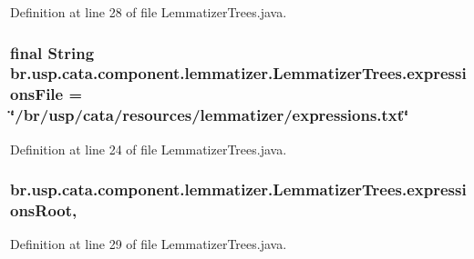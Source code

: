 Definition at line 28 of file Lemmatizer\+Trees.\+java.

\hypertarget{classbr_1_1usp_1_1cata_1_1component_1_1lemmatizer_1_1_lemmatizer_trees_aca539fbee591a27d66cc1977a0175d15}{
\subsubsection[{expressions\+File}]{\setlength{\rightskip}{0pt plus 5cm}final String br.\+usp.\+cata.\+component.\+lemmatizer.\+Lemmatizer\+Trees.\+expressions\+File = \char`\"{}/br/usp/cata/resources/lemmatizer/expressions.\+txt\char`\"{}\hspace{0.3cm}{\ttfamily [private]}}}\label{classbr_1_1usp_1_1cata_1_1component_1_1lemmatizer_1_1_lemmatizer_trees_aca539fbee591a27d66cc1977a0175d15}


Definition at line 24 of file Lemmatizer\+Trees.\+java.

\hypertarget{classbr_1_1usp_1_1cata_1_1component_1_1lemmatizer_1_1_lemmatizer_trees_a72823e09db24036c2c8e241557a3f216}{
\subsubsection[{expressions\+Root}]{ br.\+usp.\+cata.\+component.\+lemmatizer.\+Lemmatizer\+Trees.\+expressions\+Root\hspace{0.3cm}{\ttfamily [static]}, {\ttfamily [private]}}}\label{classbr_1_1usp_1_1cata_1_1component_1_1lemmatizer_1_1_lemmatizer_trees_a72823e09db24036c2c8e241557a3f216}


Definition at line 29 of file Lemmatizer\+Trees.\+java.

